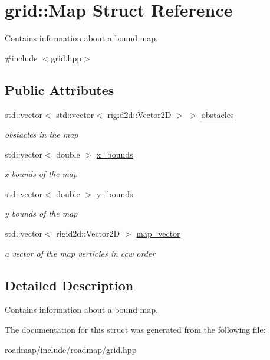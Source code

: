 \hypertarget{structgrid_1_1Map}{}\section{grid\+:\+:Map Struct Reference}
\label{structgrid_1_1Map}


Contains information about a bound map.  




{\ttfamily \#include $<$grid.\+hpp$>$}

\subsection*{Public Attributes}
\begin{DoxyCompactItemize}
\item 
\mbox{\label{structgrid_1_1Map_ab9f49bab16cb300a8de972a412c54375}} 
std\+::vector$<$ std\+::vector$<$ rigid2d\+::\+Vector2D $>$ $>$ \hyperlink{structgrid_1_1Map_ab9f49bab16cb300a8de972a412c54375}{obstacles}
\begin{DoxyCompactList}\small\item\em obstacles in the map \end{DoxyCompactList}\item 
\mbox{\label{structgrid_1_1Map_a44918e798d8fa1400ddf52bc52ce4c6f}} 
std\+::vector$<$ double $>$ \hyperlink{structgrid_1_1Map_a44918e798d8fa1400ddf52bc52ce4c6f}{x\+\_\+bounds}
\begin{DoxyCompactList}\small\item\em x bounds of the map \end{DoxyCompactList}\item 
\mbox{\label{structgrid_1_1Map_a5f51eeac70566244a15c1023e9f494fb}} 
std\+::vector$<$ double $>$ \hyperlink{structgrid_1_1Map_a5f51eeac70566244a15c1023e9f494fb}{y\+\_\+bounds}
\begin{DoxyCompactList}\small\item\em y bounds of the map \end{DoxyCompactList}\item 
\mbox{\label{structgrid_1_1Map_a5ee687d67cff44b8e447b2b92603056b}} 
std\+::vector$<$ rigid2d\+::\+Vector2D $>$ \hyperlink{structgrid_1_1Map_a5ee687d67cff44b8e447b2b92603056b}{map\+\_\+vector}
\begin{DoxyCompactList}\small\item\em a vector of the map verticies in ccw order \end{DoxyCompactList}\end{DoxyCompactItemize}


\subsection{Detailed Description}
Contains information about a bound map. 

The documentation for this struct was generated from the following file\+:\begin{DoxyCompactItemize}
\item 
roadmap/include/roadmap/\hyperlink{grid_8hpp}{grid.\+hpp}\end{DoxyCompactItemize}
